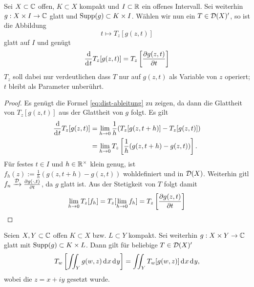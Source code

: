 \begin{lemma}
  \label{lemma:dist-glatt}
  Sei $X \subset \mathbb{C}$ offen, $K \subset X$ kompakt und $I \subset \mathbb{R}$ ein
  offenes Intervall. Sei weiterhin $g: X \times I \rightarrow \mathbb{C}$ glatt und
  $\operatorname{Supp}(g) \subset K \times I$. Wählen wir nun ein $T \in \mathcal{D}(X)'$, so ist die Abbildung
  \[
  t \mapsto T_z[g(z,t)]
  \]
  glatt auf $I$ und genügt
\begin{align}
  \frac{\d}{\d[t]} T_z[g(z,t)] = T_z \left [ \frac{\partial
      g(z,t)}{\partial t} \right ] \label{eq:dist-ableitung}
  \end{align}
  $T_z$ soll dabei nur verdeutlichen dass $T$ nur auf $g(z,t)$ als
  Variable von $z$ operiert; $t$ bleibt als Parameter unberührt.
\end{lemma}

\begin{proof}
  Es genügt die Formel \eqref{eq:dist-ableitung} zu zeigen, da dann
  die Glattheit von $T_z[g(z,t)]$ aus der Glattheit von $g$ folgt. 
  Es gilt
  \begin{align*}
    \frac{\d}{\d[t]} T_z[g(z,t)] & = \lim_{h \ra 0} \frac1h (
    T_z[g(z,t+h)] - T_z[g(z,t)] ) \\
    & = \lim_{h \ra 0} T_z \left [ \frac1h (g(z,t+h) - g(z,t)) \right ].
  \end{align*}
  Für festes $t \in I$ und $h \in \mathbb{R}^\times$ klein genug, ist $f_h(z)
  := \frac1h ( g(z, t+h) - g(z,t))$ wohldefiniert und in
  $\mathcal{D}(X)$. Weiterhin gitl $f_n \xrightarrow{\mathcal{D}}
  \frac{\partial g(\cdot, t)}{\partial t}$, da $g$ glatt ist. 
  Aus der Stetigkeit von $T$ folgt damit
  \[
  \lim_{h\rightarrow 0} T_z[f_h] = T_z[\lim_{h \rightarrow 0} f_h] = T_z\left[
    \frac{\partial g(z,t)}{\partial t} \right]
  \]
\end{proof}

\begin{lemma}
  \label{lemma:dist-int}
  Seien $X,Y \subset \mathbb{C}$ offen $K \subset X$ bzw. $L \subset Y$
  kompakt. Sei weiterhin $g: X \times Y \rightarrow \mathbb{C}$ glatt mit $\operatorname{Supp}(g)
  \subset K \times L$. 
  Dann gilt für beliebige $T \in \mathcal{D}(X)'$
  \[
  T_w\left [ \iint_Y g(w,z) \d[x]\d[y] \right ] = \iint_Y T_w [
  g(w,z)] \d[x]\d[y],
  \]
  wobei die $z = x + iy$ gesetzt wurde.
\end{lemma}

